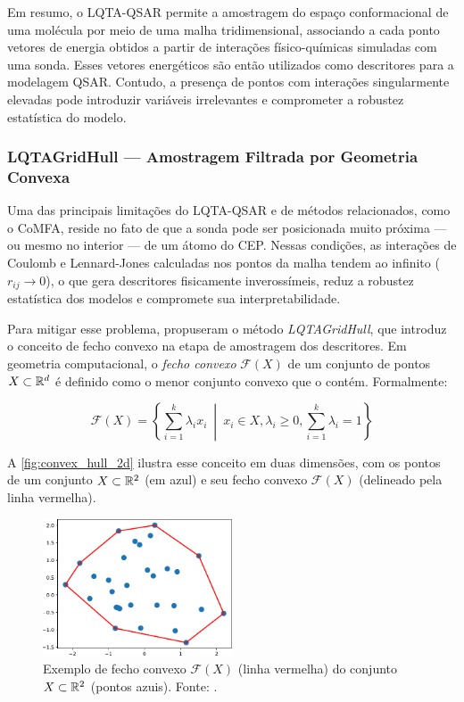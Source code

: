 Em resumo, o LQTA-QSAR permite a amostragem do espaço conformacional de uma molécula por meio de uma malha tridimensional, associando a cada ponto vetores de energia obtidos a partir de interações físico-químicas simuladas com uma sonda. Esses vetores energéticos são então utilizados como descritores para a modelagem QSAR. Contudo, a presença de pontos com interações singularmente elevadas pode introduzir variáveis irrelevantes e comprometer a robustez estatística do modelo.

\subsubsection{LQTAGridHull — Amostragem Filtrada por Geometria Convexa}

Uma das principais limitações do LQTA-QSAR e de métodos relacionados, como o CoMFA, reside no fato de que a sonda pode ser posicionada muito próxima --- ou mesmo no interior --- de um átomo do CEP. Nessas condições, as interações de Coulomb e Lennard-Jones calculadas nos pontos da malha tendem ao infinito ($r_{ij} \to 0$), o que gera descritores fisicamente inverossímeis, reduz a robustez estatística dos modelos e compromete sua interpretabilidade.

Para mitigar esse problema, \textcite{Tenorio2018} propuseram o método \textit{LQTAGridHull}, que introduz o conceito de fecho convexo na etapa de amostragem dos descritores. Em geometria computacional, o \emph{fecho convexo} $\mathcal{F}(X)$ de um conjunto de pontos $X \subset \mathbb{R}^d$ é definido como o menor conjunto convexo que o contém. Formalmente:

\begin{equation} \label{eq:def-convex-hull}
\mathcal{F}(X) = \left\{ \sum_{i=1}^{k} \lambda_i x_i \ \middle| \ x_i \in X, \lambda_i \ge 0, \sum_{i=1}^{k} \lambda_i = 1 \right\}
\end{equation}

A \autoref{fig:convex_hull_2d} ilustra esse conceito em duas dimensões, com os pontos de um conjunto $X \subset \mathbb{R}^2$ (em azul) e seu fecho convexo $\mathcal{F}(X)$ (delineado pela linha vermelha).

\begin{figure}
  \centering
  \includegraphics[width=0.5\textwidth]{img/convex_hull_2d.pdf}
  \caption{Exemplo de fecho convexo $\mathcal{F}(X)$ (linha vermelha) do conjunto $X \subset \mathbb{R}^2$ (pontos azuis). Fonte: \textcite{Tenorio2018}.}
  \label{fig:convex_hull_2d}
\end{figure}


